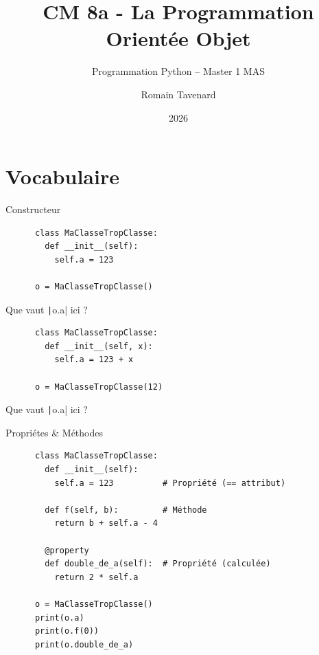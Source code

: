\documentclass[10pt]{beamer}
\title[M1 MAS -- Python -- POO]{CM 8a - La Programmation Orientée Objet}
\subtitle{Programmation Python -- Master 1 MAS}
\author{Romain Tavenard}
\date{2026}
\institute{%
\hypersetup{urlcolor=.}
\makebox[2.2ex][c]{\faEnvelope}\enspace\href{mailto:romain.tavenard@univ-rennes2.fr}{\texttt{romain.tavenard@univ-rennes2.fr}}\\%
}
\begin{document}
\maketitle

\section{Vocabulaire}

\begin{frame}[fragile]{Constructeur}
  \begin{beamercodeblock}
    \begin{verbatim}
      class MaClasseTropClasse:
        def __init__(self):
          self.a = 123

      o = MaClasseTropClasse()
    \end{verbatim}
  \end{beamercodeblock}

  Que vaut \texttt|o.a| ici ?

  \begin{beamercodeblock}
    \begin{verbatim}
      class MaClasseTropClasse:
        def __init__(self, x):
          self.a = 123 + x

      o = MaClasseTropClasse(12)
    \end{verbatim}
  \end{beamercodeblock}

  Que vaut \texttt|o.a| ici ?
\end{frame}

\begin{frame}[fragile]{Propriétes \& Méthodes}
  \begin{beamercodeblock}
    \begin{verbatim}
      class MaClasseTropClasse:
        def __init__(self):
          self.a = 123          # Propriété (== attribut)
        
        def f(self, b):         # Méthode
          return b + self.a - 4

        @property
        def double_de_a(self):  # Propriété (calculée)
          return 2 * self.a

      o = MaClasseTropClasse()
      print(o.a)
      print(o.f(0))
      print(o.double_de_a)
    \end{verbatim}
  \end{beamercodeblock}
\end{frame}
\end{document}
